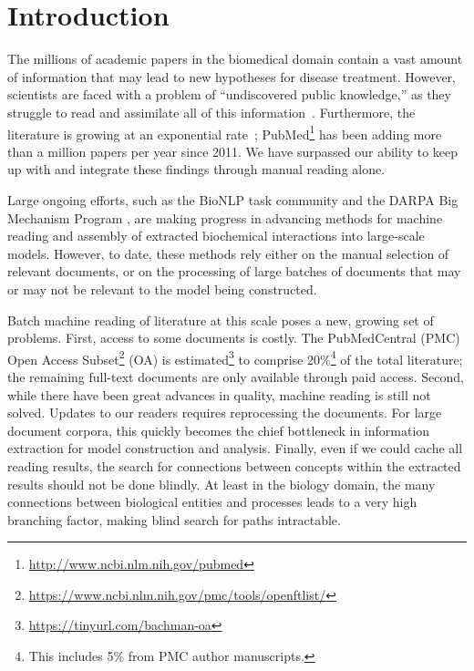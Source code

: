 \section{Introduction}

The millions of academic papers in the biomedical domain contain a vast amount of information that may lead to new hypotheses for disease treatment.  However, scientists are faced with a problem of ``undiscovered public knowledge,'' as they struggle to read and assimilate all of this information~\cite{swanson1986undiscovered}.  Furthermore, the literature is growing at an exponential rate~\citep{pautasso2012}; PubMed\footnote{\url{http://www.ncbi.nlm.nih.gov/pubmed}} has been adding more than a million papers per year since 2011. %
We have surpassed our ability to keep up with and integrate these findings through manual reading alone.

Large ongoing efforts, such as the BioNLP task community \cite{nedellec2013overview,kim2012genia,kim2009overview} and the DARPA Big Mechanism Program \cite{cohen2015}, are making progress in advancing methods for machine reading and assembly of extracted biochemical interactions into large-scale models.  However, to date, these methods rely either on the manual selection of relevant documents, or on the processing of large batches of documents that may or may not be relevant to the model being constructed.  

Batch machine reading of literature at this scale poses a new, growing set of problems.  
First, access to some documents is costly.  The PubMedCentral (PMC) Open Access Subset\footnote{\url{https://www.ncbi.nlm.nih.gov/pmc/tools/openftlist/}} (OA) is estimated\footnote{\url{https://tinyurl.com/bachman-oa}} to comprise 20\%\footnote{This includes 5\% from PMC author manuscripts.} of the total literature; the remaining full-text documents are only available through paid access.   
Second, while there have been great advances in quality, machine reading is still not solved.  Updates to our readers requires reprocessing the documents.  For large document corpora, this quickly becomes the chief bottleneck in information extraction for model construction and analysis.
Finally, even if we could cache all reading results, the search for connections between concepts within the extracted results should not be done blindly.  At least in the biology domain, the many connections between biological entities and processes leads to a very high branching factor, making blind search for paths intractable.

